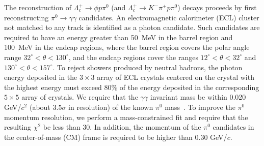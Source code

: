\documentclass[aps,prl,twocolumn,superscriptaddress,showpacs,preprintnumbers,amsmath,amssymb]{revtex4-1}
\begin{document}
The reconstruction of   $\Lambda_c^+\to \phi p\pi^0$ (and  $\Lambda_c^+\to K^- \pi^+ p\pi^0$) decays proceeds by first reconstructing $\pi^0\to\gamma\gamma$ candidates. %
An electromagnetic calorimeter (ECL) cluster not matched to any track is identified as a photon candidate. Such candidates are required to have an energy greater than 50~MeV in the barrel region and 100~MeV in the endcap regions, where the barrel region covers the polar angle range $32^{\circ} < \theta < 130^{\circ}$, and the endcap regions cover the ranges $12^{\circ} < \theta < 32^{\circ}$ and $130^{\circ}<\theta <157^{\circ}$.  To reject showers produced by neutral hadrons, the photon energy deposited in the $3\times3$ array of ECL crystals centered on the crystal with the highest energy must exceed 80\% of the energy deposited in the corresponding $5\times5$ array of crystals.  %
We require that the $\gamma\gamma$ invariant mass be within  0.020 GeV/$c^2$ (about $3.5\sigma$ in resolution)  of  the known $\pi^0$ mass~\cite{PDG}.
To improve the $\pi^0$ momentum resolution, we perform a mass-constrained fit and require that the resulting $\chi^2$ be less than 30. In addition, the momentum of the $\pi^0$ candidates in the center-of-mass (CM) frame is required to be higher than 0.30 GeV/$c$.
\end{document}

